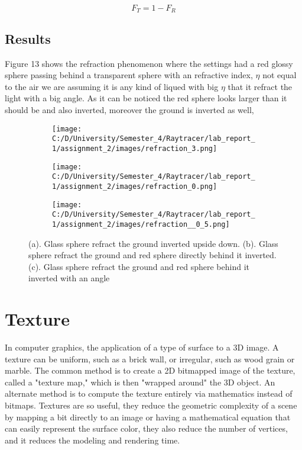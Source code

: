 \documentclass{article}
\begin{document}
\begin{equation}
F_T= 1 - F_R 
\end{equation}


\subsection{Results}
Figure 13 shows the refraction phenomenon where the settings had a red glossy sphere passing behind a transparent sphere with an refractive index, $\eta$ not equal to the air we are assuming it is any kind of liqued with big $\eta$ that it refract the light with a big angle. As it can be noticed the red sphere looks larger than it should be and also inverted, moreover the ground is inverted as well, 
\begin{figure}[H]
	\begin{subfigure}{.3\textwidth}
		\centering
		\texttt{[image: C:/D/University/Semester\_4/Raytracer/lab\_report\_1/assignment\_2/images/refraction\_3.png]}  
		\caption{}
		\label{fig:sub-first}
	\end{subfigure}
	\begin{subfigure}{.3\textwidth}
		\centering
		\texttt{[image: C:/D/University/Semester\_4/Raytracer/lab\_report\_1/assignment\_2/images/refraction\_0.png]}  
		\caption{}
		\label{fig:sub-second}
	\end{subfigure}
	\begin{subfigure}{.3\textwidth}
	\centering
	\texttt{[image: C:/D/University/Semester\_4/Raytracer/lab\_report\_1/assignment\_2/images/refraction\_\_0\_5.png]}  
	\caption{}
	\label{fig:sub-third}
\end{subfigure}

	\caption{(a). Glass sphere refract the ground inverted upside down. (b). Glass sphere refract the ground and red sphere directly behind it inverted. (c). Glass sphere refract the ground and red sphere behind it inverted with an angle}
	\label{fig:fig}
\end{figure}
\clearpage

\section{Texture}
In computer graphics, the application of a type of surface to a 3D image. A texture can be uniform, such as a brick wall, or irregular, such as wood grain or marble. The common method is to create a 2D bitmapped image of the texture, called a "texture map," which is then "wrapped around" the 3D object. An alternate method is to compute the texture entirely via mathematics instead of bitmaps. Textures are so useful, they  reduce the geometric complexity of a scene by mapping a bit directly to an image or having a mathematical equation that can easily represent the surface color, they also reduce the number of vertices, and it reduces the modeling and rendering time. 
\end{document}
